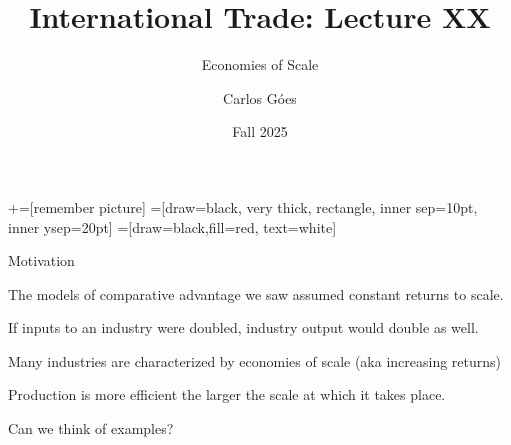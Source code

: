 \documentclass[notes,11pt, aspectratio=169, xcolor=table]{beamer}
\title[]{International Trade: Lecture XX}
\subtitle[]{Economies of Scale}
\author[Góes]
{Carlos Góes\inst{1}}
\date{Fall 2025}
\institute[GWU]{\inst{1} George Washington University }
\newenvironment{wideitemize}{\itemize\addtolength{\itemsep}{10pt}}{\enditemize}
\begin{document}
\newcommand\marktopleft[1]{%
    \tikz[overlay,remember picture] 
        \node (marker-#1-a) at (-.3em,.3em) {};%
}
\newcommand\markbottomright[2]{%
    \tikz[overlay,remember picture] 
        \node (marker-#1-b) at (0em,0em) {};%
}
+=[remember picture] 
 =[draw=black, very thick, rectangle, inner sep=10pt, inner ysep=20pt]
 =[draw=black,fill=red, text=white]















\frame{\titlepage}
\addtocounter{framenumber}{-1}




\begin{frame}{Motivation}
\begin{wideitemize}
    \item The models of comparative advantage we saw assumed constant returns to scale. 
    
    \item If inputs to an industry were doubled, industry output would double as well.
    
    \item Many industries
are characterized by economies of scale (aka increasing returns)

\item Production is more efficient the larger the scale at which it takes place.

\item Can we think of examples?
\end{wideitemize}
    
\end{frame}
\end{document}
